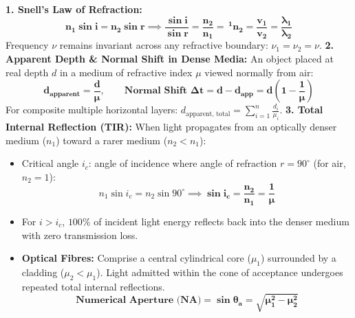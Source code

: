 \documentclass[10pt,twoside,openright]{book}
\begin{document}
\begin{formulabox}
\textbf{1. Snell's Law of Refraction:}
\begin{equation}
  \mathbf{n_1 \sin i = n_2 \sin r \implies \frac{\sin i}{\sin r} = \frac{n_2}{n_1} = \,^1n_2 = \frac{v_1}{v_2} = \frac{\lambda_1}{\lambda_2}}
\end{equation}
Frequency $\nu$ remains invariant across any refractive boundary: $\nu_1 = \nu_2 = \nu$.
\textbf{2. Apparent Depth \& Normal Shift in Dense Media:}
An object placed at real depth $d$ in a medium of refractive index $\mu$ viewed normally from air:
\begin{equation}
  \mathbf{d_{\text{apparent}} = \frac{d}{\mu}}, \qquad \mathbf{\text{Normal Shift } \Delta t = d - d_{\text{app}} = d\left(1 - \frac{1}{\mu}\right)}
\end{equation}
For composite multiple horizontal layers: $d_{\text{apparent, total}} = \sum_{i=1}^n \frac{d_i}{\mu_i}$.
\textbf{3. Total Internal Reflection (TIR):}
When light propagates from an optically denser medium ($n_1$) toward a rarer medium ($n_2 < n_1$):
\begin{itemize}
  \item Critical angle $i_c$: angle of incidence where angle of refraction $r = 90^\circ$ (for air, $n_2 = 1$):
  \begin{equation}
    n_1 \sin i_c = n_2 \sin 90^\circ \implies \mathbf{\sin i_c = \frac{n_2}{n_1} = \frac{1}{\mu}}
  \end{equation}
  \item For $i > i_c$, $100\%$ of incident light energy reflects back into the denser medium with zero transmission loss.
  \item \textbf{Optical Fibres:} Comprise a central cylindrical core ($\mu_1$) surrounded by a cladding ($\mu_2 < \mu_1$). Light admitted within the cone of acceptance undergoes repeated total internal reflections.
  \begin{equation}
    \mathbf{\text{Numerical Aperture (NA)} = \sin\theta_a = \sqrt{\mu_1^2 - \mu_2^2}}
  \end{equation}
\end{itemize}
\end{formulabox}
\end{document}
